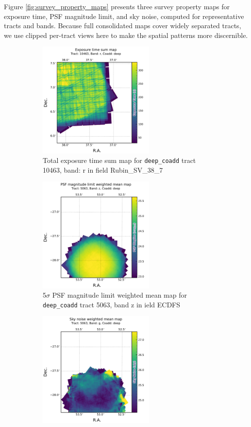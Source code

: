 Figure \ref{fig:survey_property_maps} presents three survey property maps for exposure time, \gls{PSF} magnitude limit, and sky noise, computed for representative tracts and bands.
Because full consolidated maps cover widely separated tracts, we use clipped per-\gls{tract} views here to make the spatial patterns more discernible.
\begin{figure}[hbt!]
  \centering
  \begin{subfigure}[t]{0.31\textwidth}
  \includegraphics[width=\linewidth, height=5.8cm]{deepCoadd_exposure_time_map_sum_tract10463_rband.pdf}
  \caption{Total exposure time sum map for   \texttt{deep\_coadd} \gls{tract} 10463, band: r in field Rubin\_SV\_38\_7}
  \end{subfigure}\hfill
  \begin{subfigure}[t]{0.31\textwidth}
  \includegraphics[width=\linewidth, height=5.8cm]{deepCoadd_psf_maglim_map_weighted_mean_tract5063_zband.pdf}
  \caption{5$\sigma$ PSF magnitude limit weighted mean map for \texttt{deep\_coadd} \gls{tract} 5063, band z in ield ECDFS}
  \end{subfigure}\hfill
    \begin{subfigure}[t]{0.31\textwidth}
  \includegraphics[width=\linewidth, height=5.8cm]{deepCoadd_sky_noise_map_weighted_mean_tract5063_gband.pdf}

\end{subfigure}
\end{figure}
